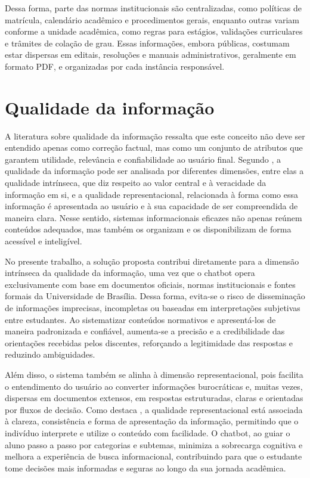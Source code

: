 Dessa forma, parte das normas institucionais são centralizadas, como políticas de matrícula, calendário acadêmico e procedimentos gerais, enquanto outras variam conforme a unidade acadêmica, como regras para estágios, validações curriculares e trâmites de colação de grau. Essas informações, embora públicas, costumam estar dispersas em editais, resoluções e manuais administrativos, geralmente em formato PDF, e organizadas por cada instância responsável.

\section{Qualidade da informação}

A literatura sobre qualidade da informação ressalta que este conceito não deve ser entendido apenas como correção factual, mas como um conjunto de atributos que garantem utilidade, relevância e confiabilidade ao usuário final. Segundo \cite{calazans2008qualidade}, a qualidade da informação pode ser analisada por diferentes dimensões, entre elas a qualidade intrínseca, que diz respeito ao valor central e à veracidade da informação em si, e a qualidade representacional, relacionada à forma como essa informação é apresentada ao usuário e à sua capacidade de ser compreendida de maneira clara. Nesse sentido, sistemas informacionais eficazes não apenas reúnem conteúdos adequados, mas também os organizam e os disponibilizam de forma acessível e inteligível.

No presente trabalho, a solução proposta contribui diretamente para a dimensão intrínseca da qualidade da informação, uma vez que o chatbot opera exclusivamente com base em documentos oficiais, normas institucionais e fontes formais da Universidade de Brasília. Dessa forma, evita-se o risco de disseminação de informações imprecisas, incompletas ou baseadas em interpretações subjetivas entre estudantes. Ao sistematizar conteúdos normativos e apresentá-los de maneira padronizada e confiável, aumenta-se a precisão e a credibilidade das orientações recebidas pelos discentes, reforçando a legitimidade das respostas e reduzindo ambiguidades.

Além disso, o sistema também se alinha à dimensão representacional, pois facilita o entendimento do usuário ao converter informações burocráticas e, muitas vezes, dispersas em documentos extensos, em respostas estruturadas, claras e orientadas por fluxos de decisão. Como destaca \cite{calazans2008qualidade}, a qualidade representacional está associada à clareza, consistência e forma de apresentação da informação, permitindo que o indivíduo interprete e utilize o conteúdo com facilidade. O chatbot, ao guiar o aluno passo a passo por categorias e subtemas, minimiza a sobrecarga cognitiva e melhora a experiência de busca informacional, contribuindo para que o estudante tome decisões mais informadas e seguras ao longo da sua jornada acadêmica.

